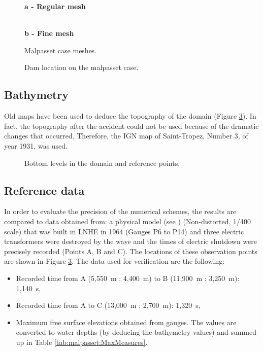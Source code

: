 \begin{figure}[H]
  \centering
  \textbf{a - Regular mesh}\par\medskip
   \\
  \textbf{b - Fine mesh}\par\medskip
  \caption{Malpasset case meshes.}
  \label{fig:malpasset:Mesh}
\end{figure}

\begin{figure}[H] %
  \centering
  \caption{Dam location on the malpasset case.}
  \label{fig:malpasset:mesh_dam}
\end{figure}

\subsection{Bathymetry}
Old maps have been used to deduce the topography of the domain
(Figure \ref{fig:malpasset:bathy}).
In fact, the topography after the accident could not be used because of the
dramatic changes that occurred.
Therefore, the IGN map of Saint-Tropez, Number 3, of year 1931, was used.

\begin{figure}[H] %
  \centering
  \caption{Bottom levels in the domain and reference points.}
  \label{fig:malpasset:bathy}
\end{figure}

\subsection{Reference data}
In order to evaluate the precision of the numerical schemes, the results are
compared to data obtained from:
a physical model (see \cite{Hervouet2007}) (Non-distorted, 1/400 scale) that was
built in LNHE in 1964 (Gauges P6 to P14) and three electric transformers were
destroyed by the wave and the times of electric shutdown were precisely recorded
(Points A, B and C).
The locations of these observation points are shown in Figure
\ref{fig:malpasset:bathy}.
The data used for verification are the following:
\begin{itemize}
\item Recorded time from A (5,550~m ; 4,400~m) to B (11,900~m ; 3,250~m): 1,140~s,
\item Recorded time from A to C (13,000~m ; 2,700~m): 1,320~s,
\item Maximum free surface elevations obtained from gauges.
The values are converted to water depths (by deducing the bathymetry values) and
summed up in Table \ref{tab:malpasset:MaxMeasures}.
\end{itemize}

